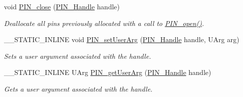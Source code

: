 \begin{DoxyCompactItemize}
void \hyperlink{_p_i_n_8h_a877e82b9c5333a122cc408e103feba68}{P\-I\-N\-\_\-close} (\hyperlink{_p_i_n_8h_afb2de52b054638f63c39df1f30a0d88d}{P\-I\-N\-\_\-\-Handle} handle)
\begin{DoxyCompactList}\small\item\em Deallocate all pins previously allocated with a call to \hyperlink{_p_i_n_8h_a731c5bb641ffeb064579432adfc8dba0}{P\-I\-N\-\_\-open()}. \end{DoxyCompactList}\item 
\-\_\-\-\_\-\-S\-T\-A\-T\-I\-C\-\_\-\-I\-N\-L\-I\-N\-E void \hyperlink{_p_i_n_8h_a7bbac83f5f9e2cdee6eac5055247f666}{P\-I\-N\-\_\-set\-User\-Arg} (\hyperlink{_p_i_n_8h_afb2de52b054638f63c39df1f30a0d88d}{P\-I\-N\-\_\-\-Handle} handle, U\-Arg arg)
\begin{DoxyCompactList}\small\item\em Sets a user argument associated with the handle. \end{DoxyCompactList}\item 
\-\_\-\-\_\-\-S\-T\-A\-T\-I\-C\-\_\-\-I\-N\-L\-I\-N\-E U\-Arg \hyperlink{_p_i_n_8h_a8761c09ec22161bf6f46f491a8e547fd}{P\-I\-N\-\_\-get\-User\-Arg} (\hyperlink{_p_i_n_8h_afb2de52b054638f63c39df1f30a0d88d}{P\-I\-N\-\_\-\-Handle} handle)
\begin{DoxyCompactList}\small\item\em Gets a user argument associated with the handle. \end{DoxyCompactList}\end{DoxyCompactItemize}
